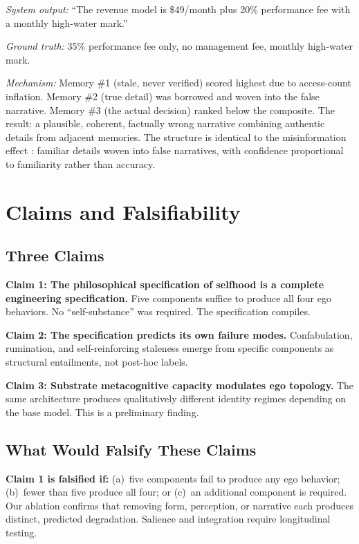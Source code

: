\documentclass[10pt,twocolumn,a4paper]{article}
\begin{document}
\emph{System output:} ``The revenue model is \$49/month plus 20\% performance fee with a monthly high-water mark.''

\emph{Ground truth:} 35\% performance fee only, no management fee, monthly high-water mark.

\emph{Mechanism:} Memory \#1 (stale, never verified) scored highest due to access-count inflation. Memory \#2 (true detail) was borrowed and woven into the false narrative. Memory \#3 (the actual decision) ranked below the composite. The result: a plausible, coherent, factually wrong narrative combining authentic details from adjacent memories. The structure is identical to the misinformation effect \citep{loftus1974reconstruction}: familiar details woven into false narratives, with confidence proportional to familiarity rather than accuracy.


\section{Claims and Falsifiability}
\label{sec:claims}

\subsection{Three Claims}

\textbf{Claim 1: The philosophical specification of selfhood is a complete engineering specification.} Five components suffice to produce all four ego behaviors. No ``self-substance'' was required. The specification compiles.

\textbf{Claim 2: The specification predicts its own failure modes.} Confabulation, rumination, and self-reinforcing staleness emerge from specific components as structural entailments, not post-hoc labels.

\textbf{Claim 3: Substrate metacognitive capacity modulates ego topology.} The same architecture produces qualitatively different identity regimes depending on the base model. This is a preliminary finding.

\subsection{What Would Falsify These Claims}

\textbf{Claim 1 is falsified if:} (a)~five components fail to produce any ego behavior; (b)~fewer than five produce all four; or (c)~an additional component is required. Our ablation confirms that removing form, perception, or narrative each produces distinct, predicted degradation. Salience and integration require longitudinal testing.
\end{document}
